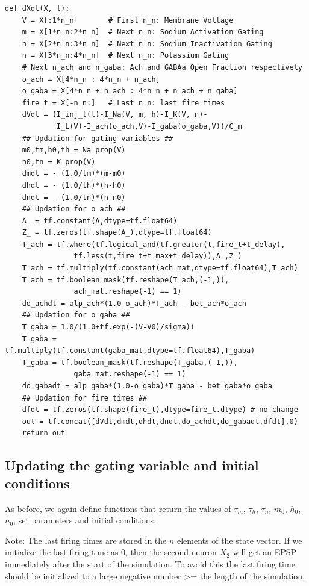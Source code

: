 \documentclass[10pt,letterpaper]{article}
\begin{document}
\begin{verbatim}
def dXdt(X, t):
    V = X[:1*n_n]       # First n_n: Membrane Voltage
    m = X[1*n_n:2*n_n]  # Next n_n: Sodium Activation Gating
    h = X[2*n_n:3*n_n]  # Next n_n: Sodium Inactivation Gating
    n = X[3*n_n:4*n_n]  # Next n_n: Potassium Gating
    # Next n_ach and n_gaba: Ach and GABAa Open Fraction respectively
    o_ach = X[4*n_n : 4*n_n + n_ach]
    o_gaba = X[4*n_n + n_ach : 4*n_n + n_ach + n_gaba] 
    fire_t = X[-n_n:]   # Last n_n: last fire times
    dVdt = (I_inj_t(t)-I_Na(V, m, h)-I_K(V, n)-
    		I_L(V)-I_ach(o_ach,V)-I_gaba(o_gaba,V))/C_m 
    ## Updation for gating variables ##
    m0,tm,h0,th = Na_prop(V)
    n0,tn = K_prop(V)
    dmdt = - (1.0/tm)*(m-m0)
    dhdt = - (1.0/th)*(h-h0)
    dndt = - (1.0/tn)*(n-n0)
    ## Updation for o_ach ##
    A_ = tf.constant(A,dtype=tf.float64)
    Z_ = tf.zeros(tf.shape(A_),dtype=tf.float64)
    T_ach = tf.where(tf.logical_and(tf.greater(t,fire_t+t_delay),
    			tf.less(t,fire_t+t_max+t_delay)),A_,Z_) 
    T_ach = tf.multiply(tf.constant(ach_mat,dtype=tf.float64),T_ach)
    T_ach = tf.boolean_mask(tf.reshape(T_ach,(-1,)),
    			ach_mat.reshape(-1) == 1)
    do_achdt = alp_ach*(1.0-o_ach)*T_ach - bet_ach*o_ach
    ## Updation for o_gaba ##
    T_gaba = 1.0/(1.0+tf.exp(-(V-V0)/sigma))
    T_gaba = tf.multiply(tf.constant(gaba_mat,dtype=tf.float64),T_gaba)
    T_gaba = tf.boolean_mask(tf.reshape(T_gaba,(-1,)),
    			gaba_mat.reshape(-1) == 1)
    do_gabadt = alp_gaba*(1.0-o_gaba)*T_gaba - bet_gaba*o_gaba
    ## Updation for fire times ##
    dfdt = tf.zeros(tf.shape(fire_t),dtype=fire_t.dtype) # no change
    out = tf.concat([dVdt,dmdt,dhdt,dndt,do_achdt,do_gabadt,dfdt],0)
    return out
\end{verbatim}

\subsection*{Updating the gating variable and initial conditions}

As before, we again define functions that return the values of $\tau_m$, $\tau_h$, $\tau_n$, $m_0$, $h_0$, $n_0$, set parameters and initial conditions. 

Note: The last firing times are stored in the $n$ elements of the state vector. If we initialize the last firing time as 0, then the second neuron $X_2$ will get an EPSP immediately after the start of the simulation. To avoid this the last firing time should be initialized to a large negative number >= the length of the simulation.
\end{document}
